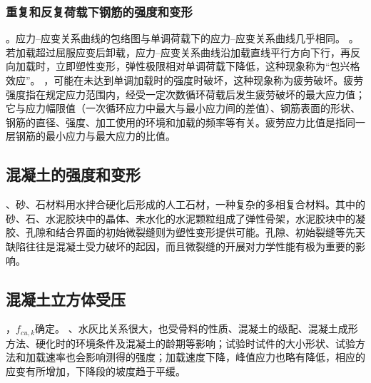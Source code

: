 \documentclass{article}
\newcommand{\gb}{《混凝土结构设计规范》（GB 50010）}
\begin{document}
\subsubsection{重复和反复荷载下钢筋的强度和变形}
。应力--应变关系曲线的包络图与单调荷载下的应力--应变关系曲线几乎相同。
。若加载超过屈服应变后卸载，应力--应变关系曲线沿加载直线平行方向下行，再反向加载时，立即塑性变形，弹性极限相对单调荷载下降低，这种现象称为“包兴格效应”。
，可能在未达到单调加载时的强度时破坏，这种现象称为疲劳破坏。疲劳强度指在规定应力范围内，经受一定次数循环荷载后发生疲劳破坏的最大应力值；它与应力幅限值（一次循环应力中最大与最小应力间的差值）、钢筋表面的形状、钢筋的直径、强度、加工使用的环境和加载的频率等有关。疲劳应力比值是指同一层钢筋的最小应力与最大应力的比值。
\subsection{混凝土的强度和变形}
、砂、石材料用水拌合硬化后形成的人工石材，一种复杂的多相复合材料。其中的砂、石、水泥胶块中的晶体、未水化的水泥颗粒组成了弹性骨架，水泥胶块中的凝胶、孔隙和结合界面的初始微裂缝则为塑性变形提供可能。孔隙、初始裂缝等先天缺陷往往是混凝土受力破坏的起因，而且微裂缝的开展对力学性能有极为重要的影响。
\subsection{混凝土立方体受压}
，$f_{cu,k}$确定。
、水灰比关系很大，也受骨料的性质、混凝土的级配、混凝土成形方法、硬化时的环境条件及混凝土的龄期等影响；试验时试件的大小形状、试验方法和加载速率也会影响测得的强度；加载速度下降，峰值应力也略有降低，相应的应变有所增加，下降段的坡度趋于平缓。
\end{document}
